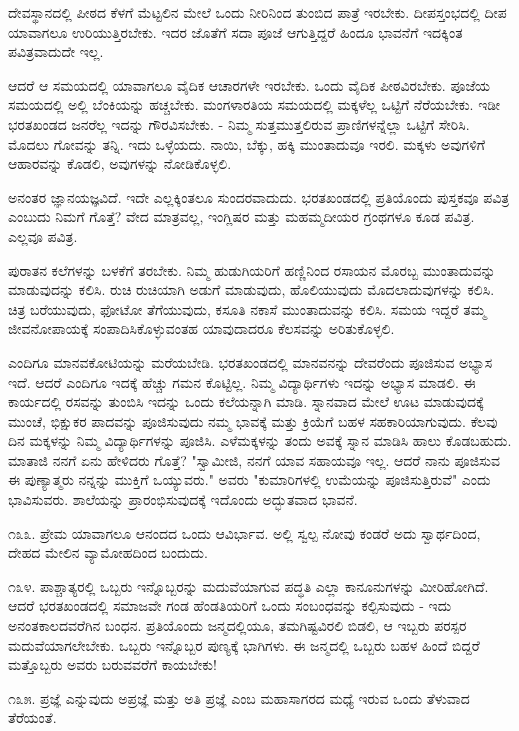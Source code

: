 ದೇವಸ್ಥಾನದಲ್ಲಿ ಪೀಠದ ಕೆಳಗೆ ಮೆಟ್ಟಲಿನ ಮೇಲೆ ಒಂದು ನೀರಿನಿಂದ ತುಂಬಿದ ಪಾತ್ರೆ ಇರಬೇಕು. ದೀಪಸ್ತಂಭದಲ್ಲಿ ದೀಪ ಯಾವಾಗಲೂ ಉರಿಯುತ್ತಿರಬೇಕು. ಇದರ ಜೊತೆಗೆ ಸದಾ ಪೂಜೆ ಆಗುತ್ತಿದ್ದರೆ ಹಿಂದೂ ಭಾವನೆಗೆ ಇದಕ್ಕಿಂತ ಪವಿತ್ರವಾದುದೇ ಇಲ್ಲ.

ಆದರೆ ಆ ಸಮಯದಲ್ಲಿ ಯಾವಾಗಲೂ ವೈದಿಕ ಆಚಾರಗಳೇ ಇರಬೇಕು. ಒಂದು ವೈದಿಕ ಪೀಠವಿರಬೇಕು. ಪೂಜೆಯ ಸಮಯದಲ್ಲಿ ಅಲ್ಲಿ ಬೆಂಕಿಯನ್ನು ಹಚ್ಚಬೇಕು. ಮಂಗಳಾರತಿಯ ಸಮಯದಲ್ಲಿ ಮಕ್ಕಳೆಲ್ಲ ಒಟ್ಟಿಗೆ ನೆರೆಯಬೇಕು. ಇಡೀ ಭರತಖಂಡದ ಜನರೆಲ್ಲ ಇದನ್ನು ಗೌರವಿಸಬೇಕು. - ನಿಮ್ಮ ಸುತ್ತಮುತ್ತಲಿರುವ ಪ್ರಾಣಿಗಳನ್ನೆಲ್ಲಾ ಒಟ್ಟಿಗೆ ಸೇರಿಸಿ. ಮೊದಲು ಗೋವನ್ನು ತನ್ನಿ. ಇದು ಒಳ್ಳೆಯದು. ನಾಯಿ, ಬೆಕ್ಕು, ಹಕ್ಕಿ ಮುಂತಾದುವೂ ಇರಲಿ. ಮಕ್ಕಳು ಅವುಗಳಿಗೆ ಆಹಾರವನ್ನು ಕೊಡಲಿ, ಅವುಗಳನ್ನು ನೋಡಿಕೊಳ್ಳಲಿ.

ಅನಂತರ ಜ್ಞಾನಯಜ್ಞವಿದೆ. ಇದೇ ಎಲ್ಲಕ್ಕಿಂತಲೂ ಸುಂದರವಾದುದು. ಭರತಖಂಡದಲ್ಲಿ ಪ್ರತಿಯೊಂದು ಪುಸ್ತಕವೂ ಪವಿತ್ರ ಎಂಬುದು ನಿಮಗೆ ಗೊತ್ತೆ? ವೇದ ಮಾತ್ರವಲ್ಲ, ಇಂಗ್ಲಿಷರ ಮತ್ತು ಮಹಮ್ಮದೀಯರ ಗ್ರಂಥಗಳೂ ಕೂಡ ಪವಿತ್ರ. ಎಲ್ಲವೂ ಪವಿತ್ರ.

ಪುರಾತನ ಕಲೆಗಳನ್ನು ಬಳಕೆಗೆ ತರಬೇಕು. ನಿಮ್ಮ ಹುಡುಗಿಯರಿಗೆ ಹಣ್ಣಿನಿಂದ ರಸಾಯನ ಮೊರಬ್ಬ ಮುಂತಾದುವನ್ನು ಮಾಡುವುದನ್ನು ಕಲಿಸಿ. ರುಚಿ ರುಚಿಯಾಗಿ ಅಡುಗೆ ಮಾಡುವುದು, ಹೊಲಿಯುವುದು ಮೊದಲಾದುವುಗಳನ್ನು ಕಲಿಸಿ. ಚಿತ್ರ ಬರೆಯುವುದು, ಫೋಟೋ ತೆಗೆಯುವುದು, ಕಸೂತಿ ನಕಾಸೆ ಮುಂತಾದುವನ್ನು ಕಲಿಸಿ. ಸಮಯ ಇದ್ದರೆ ತಮ್ಮ ಜೀವನೋಪಾಯಕ್ಕೆ ಸಂಪಾದಿಸಿಕೊಳ್ಳುವಂತಹ ಯಾವುದಾದರೂ ಕೆಲಸವನ್ನು ಅರಿತುಕೊಳ್ಳಲಿ.

ಎಂದಿಗೂ ಮಾನವಕೋಟಿಯನ್ನು ಮರೆಯಬೇಡಿ. ಭರತಖಂಡದಲ್ಲಿ ಮಾನವನನ್ನು ದೇವರೆಂದು ಪೂಜಿಸುವ ಅಭ್ಯಾಸ ಇದೆ. ಆದರೆ ಎಂದಿಗೂ ಇದಕ್ಕೆ ಹೆಚ್ಚು ಗಮನ ಕೊಟ್ಟಿಲ್ಲ. ನಿಮ್ಮ ವಿದ್ಯಾರ್ಥಿಗಳು ಇದನ್ನು ಅಭ್ಯಾಸ ಮಾಡಲಿ. ಈ ಕಾರ್ಯದಲ್ಲಿ ರಸವನ್ನು ತುಂಬಿಸಿ ಇದನ್ನು ಒಂದು ಕಲೆಯನ್ನಾಗಿ ಮಾಡಿ. ಸ್ನಾನವಾದ ಮೇಲೆ ಊಟ ಮಾಡುವುದಕ್ಕೆ ಮುಂಚೆ, ಭಿಕ್ಷುಕರ ಪಾದವನ್ನು ಪೂಜಿಸುವುದು ನಮ್ಮ ಭಾವಕ್ಕೆ ಮತ್ತು ಕ್ರಿಯೆಗೆ ಬಹಳ ಸಹಕಾರಿಯಾಗುವುದು. ಕೆಲವು ದಿನ ಮಕ್ಕಳನ್ನು ನಿಮ್ಮ ವಿದ್ಯಾರ್ಥಿಗಳನ್ನು ಪೂಜಿಸಿ. ಎಳೆಮಕ್ಕಳನ್ನು ತಂದು ಅವಕ್ಕೆ ಸ್ನಾನ ಮಾಡಿಸಿ ಹಾಲು ಕೊಡಬಹುದು. ಮಾತಾಜಿ ನನಗೆ ಏನು ಹೇಳಿದರು ಗೊತ್ತೆ? "ಸ್ವಾಮೀಜಿ, ನನಗೆ ಯಾವ ಸಹಾಯವೂ ಇಲ್ಲ. ಆದರೆ ನಾನು ಪೂಜಿಸುವ ಈ ಪುಣ್ಯಾತ್ಮರು ನನ್ನನ್ನು ಮುಕ್ತಿಗೆ ಒಯ್ಯುವರು." ಅವರು "ಕುಮಾರಿಗಳಲ್ಲಿ ಉಮೆಯನ್ನು ಪೂಜಿಸುತ್ತಿರುವೆ" ಎಂದು ಭಾವಿಸುವರು. ಶಾಲೆಯನ್ನು ಪ್ರಾರಂಭಿಸುವುದಕ್ಕೆ ಇದೊಂದು ಅದ್ಭುತವಾದ ಭಾವನೆ.

೧೩೩. ಪ್ರೇಮ ಯಾವಾಗಲೂ ಆನಂದದ ಒಂದು ಆವಿರ್ಭಾವ. ಅಲ್ಲಿ ಸ್ವಲ್ಪ ನೋವು ಕಂಡರೆ ಅದು ಸ್ವಾರ್ಥದಿಂದ, ದೇಹದ ಮೇಲಿನ ವ್ಯಾಮೋಹದಿಂದ ಬಂದುದು.

೧೩೪. ಪಾಶ್ಚಾತ್ಯರಲ್ಲಿ ಒಬ್ಬರು ಇನ್ನೊಬ್ಬರನ್ನು ಮದುವೆಯಾಗುವ ಪದ್ಧತಿ ಎಲ್ಲಾ ಕಾನೂನುಗಳನ್ನು ಮೀರಿಹೋಗಿದೆ. ಆದರೆ ಭರತಖಂಡದಲ್ಲಿ ಸಮಾಜವೇ ಗಂಡ ಹೆಂಡತಿಯರಿಗೆ ಒಂದು ಸಂಬಂಧವನ್ನು ಕಲ್ಪಿಸುವುದು - ಇದು ಅನಂತಕಾಲದವರೆಗಿನ ಬಂಧನ. ಪ್ರತಿಯೊಂದು ಜನ್ಮದಲ್ಲಿಯೂ, ತಮಗಿಷ್ಟವಿರಲಿ ಬಿಡಲಿ, ಆ ಇಬ್ಬರು ಪರಸ್ಪರ ಮದುವೆಯಾಗಲೇಬೇಕು. ಒಬ್ಬರು ಇನ್ನೊಬ್ಬರ ಪುಣ್ಯಕ್ಕೆ ಭಾಗಿಗಳು. ಈ ಜನ್ಮದಲ್ಲಿ ಒಬ್ಬರು ಬಹಳ ಹಿಂದೆ ಬಿದ್ದರೆ ಮತ್ತೊಬ್ಬರು ಅವರು ಬರುವವರೆಗೆ ಕಾಯಬೇಕು!

೧೩೫. ಪ್ರಜ್ಞೆ ಎನ್ನುವುದು ಅಪ್ರಜ್ಞೆ  ಮತ್ತು ಅತಿ ಪ್ರಜ್ಞೆ  ಎಂಬ ಮಹಾಸಾಗರದ ಮಧ್ಯೆ ಇರುವ ಒಂದು ತೆಳುವಾದ ತೆರೆಯಂತೆ.

